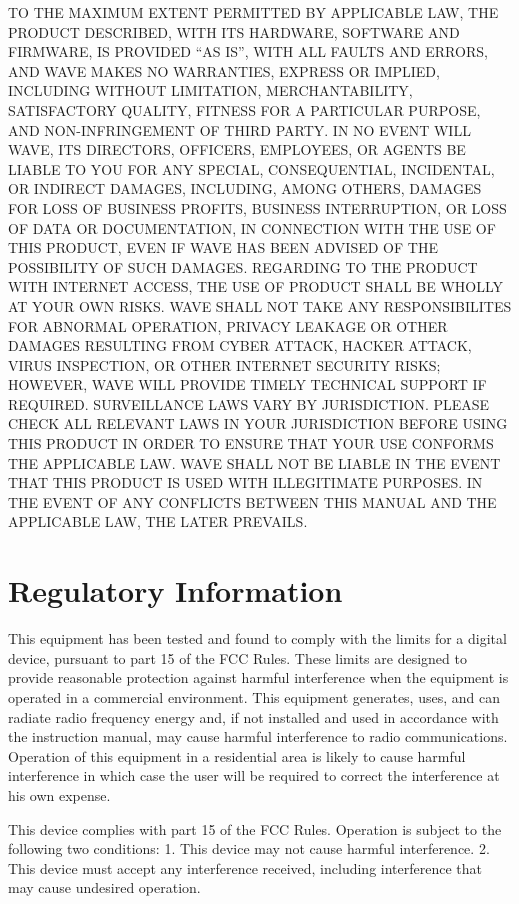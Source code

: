 \documentclass[letterpaper,10pt,openany,oneside,english]{sphinxmanual}
\begin{document}
TO THE MAXIMUM EXTENT PERMITTED BY APPLICABLE LAW, THE PRODUCT DESCRIBED, WITH ITS HARDWARE, SOFTWARE AND FIRMWARE, IS PROVIDED “AS IS”, WITH ALL FAULTS AND ERRORS, AND WAVE MAKES NO WARRANTIES, EXPRESS OR IMPLIED, INCLUDING WITHOUT LIMITATION, MERCHANTABILITY, SATISFACTORY QUALITY, FITNESS FOR A PARTICULAR PURPOSE, AND NON-INFRINGEMENT OF THIRD PARTY. IN NO EVENT WILL WAVE, ITS DIRECTORS, OFFICERS, EMPLOYEES, OR AGENTS BE LIABLE TO YOU FOR ANY SPECIAL, CONSEQUENTIAL, INCIDENTAL, OR INDIRECT DAMAGES, INCLUDING, AMONG OTHERS, DAMAGES FOR LOSS OF BUSINESS PROFITS, BUSINESS INTERRUPTION, OR LOSS OF DATA OR DOCUMENTATION, IN CONNECTION WITH THE USE OF THIS PRODUCT, EVEN IF WAVE HAS BEEN ADVISED OF THE POSSIBILITY OF SUCH DAMAGES.
REGARDING TO THE PRODUCT WITH INTERNET ACCESS, THE USE OF PRODUCT SHALL BE WHOLLY AT YOUR OWN RISKS. WAVE SHALL NOT TAKE ANY RESPONSIBILITES FOR ABNORMAL OPERATION, PRIVACY LEAKAGE OR OTHER DAMAGES RESULTING FROM CYBER ATTACK, HACKER ATTACK, VIRUS INSPECTION, OR OTHER INTERNET SECURITY RISKS; HOWEVER, WAVE WILL PROVIDE TIMELY TECHNICAL SUPPORT IF REQUIRED.
SURVEILLANCE LAWS VARY BY JURISDICTION. PLEASE CHECK ALL RELEVANT LAWS IN YOUR JURISDICTION BEFORE USING THIS PRODUCT IN ORDER TO ENSURE THAT YOUR USE CONFORMS THE APPLICABLE LAW. WAVE SHALL NOT BE LIABLE IN THE EVENT THAT THIS PRODUCT IS USED WITH ILLEGITIMATE PURPOSES.
IN THE EVENT OF ANY CONFLICTS BETWEEN THIS MANUAL AND THE APPLICABLE LAW, THE LATER PREVAILS.


\section{Regulatory Information}
\label{\detokenize{legalandsafety:regulatory-information}}

 This equipment has been tested and found to comply with the limits for a digital device, pursuant to part 15 of the FCC Rules. These limits are designed to provide reasonable protection against harmful interference when the equipment is operated in a commercial environment. This equipment generates, uses, and can radiate radio frequency energy and, if not installed and used in accordance with the instruction manual, may cause harmful interference to radio communications. Operation of this equipment in a residential area is likely to cause harmful interference in which case the user will be required to correct the interference at his own expense.

This device complies with part 15 of the FCC Rules. Operation is subject to the following two conditions: 1. This device may not cause harmful interference. 2. This device must accept any interference received, including interference that may cause undesired operation.
\end{document}
